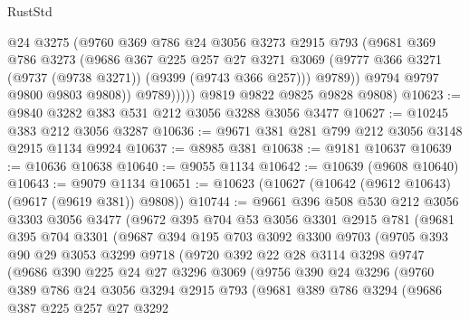 \begin{lexlean}{RustStd}
\begin{coremodule}
                  @24
                  @3275
                  (@9760
                    @369
                    @786
                    @24
                    @3056
                    @3273
                    @2915
                    @793
                    (@9681
                      @369
                      @786
                      @3273
                      (@9686
                        @367
                        @225
                        @257
                        @27
                        @3271
                        @3069
                        (@9777 @366 @3271 (@9737 (@9738 @3271)) (@9399 (@9743 @366 @257)))
                        @9789))
                    @9794
                    @9797
                    @9800
                    @9803
                    @9808))
                @9789)))))
      @9819
      @9822
      @9825
      @9828
      @9808)
@10623 := @9840 @3282 @383 @531 @212 @3056 @3288 @3056 @3477
@10627 := @10245 @383 @212 @3056 @3287
@10636 := @9671 @381 @281 @799 @212 @3056 @3148 @2915 @1134 @9924
@10637 := @8985 @381
@10638 := @9181 @10637
@10639 := @10636 @10638
@10640 := @9055 @1134
@10642 := @10639 (@9608 @10640)
@10643 := @9079 @1134
@10651 := @10623 (@10627 (@10642 (@9612 @10643) (@9617 (@9619 @381)) @9808))
@10744 := @9661
    @396
    @508
    @530
    @212
    @3056
    @3303
    @3056
    @3477
    (@9672
      @395
      @704
      @53
      @3056
      @3301
      @2915
      @781
      (@9681
        @395
        @704
        @3301
        (@9687
          @394
          @195
          @703
          @3092
          @3300
          @9703
          (@9705
            @393
            @90
            @29
            @3053
            @3299
            @9718
            (@9720
              @392
              @22
              @28
              @3114
              @3298
              @9747
              (@9686
                @390
                @225
                @24
                @27
                @3296
                @3069
                (@9756
                  @390
                  @24
                  @3296
                  (@9760
                    @389
                    @786
                    @24
                    @3056
                    @3294
                    @2915
                    @793
                    (@9681
                      @389
                      @786
                      @3294
                      (@9686
                        @387
                        @225
                        @257
                        @27
                        @3292

\end{coremodule}
\end{lexlean}
